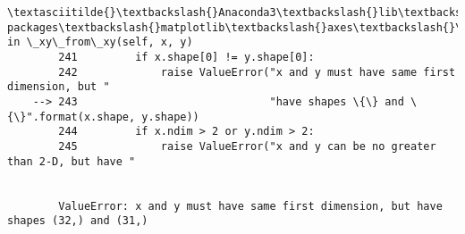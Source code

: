 \documentclass[11pt]{article}
\begin{document}
\begin{Verbatim}[commandchars=\\\{\}]
        \textasciitilde{}\textbackslash{}Anaconda3\textbackslash{}lib\textbackslash{}site-packages\textbackslash{}matplotlib\textbackslash{}axes\textbackslash{}\_base.py in \_xy\_from\_xy(self, x, y)
        241         if x.shape[0] != y.shape[0]:
        242             raise ValueError("x and y must have same first dimension, but "
    --> 243                              "have shapes \{\} and \{\}".format(x.shape, y.shape))
        244         if x.ndim > 2 or y.ndim > 2:
        245             raise ValueError("x and y can be no greater than 2-D, but have "
    

        ValueError: x and y must have same first dimension, but have shapes (32,) and (31,)

    \end{Verbatim}

    \begin{center}
    \end{center}
    { \hspace*{\fill} \\}
    

    
    
    
    
\end{document}

